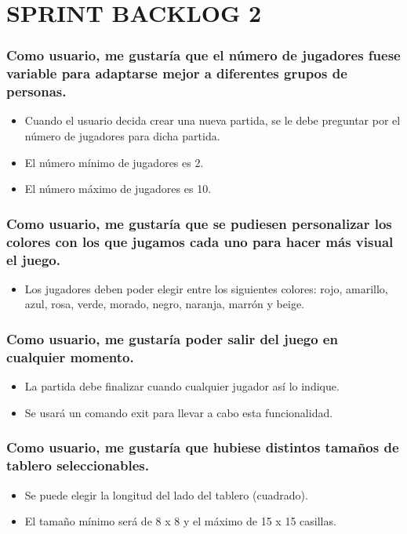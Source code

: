 \documentclass{article}
\begin{document}
\newpage
\section*{SPRINT BACKLOG 2}
\subsubsection*{Como usuario, me gustaría que el número de jugadores fuese variable para adaptarse mejor a diferentes grupos de personas.}

\begin{itemize}
\item Cuando el usuario decida crear una nueva partida, se le debe preguntar por el número de jugadores para dicha partida.

\item El número mínimo de jugadores es 2.

\item El número máximo de jugadores es 10.

\end{itemize}

\subsubsection*{Como usuario, me gustaría que se pudiesen personalizar los colores con los que jugamos cada uno para hacer más visual el juego.}
\begin{itemize}

\item Los jugadores deben poder elegir entre los siguientes colores: rojo, amarillo, azul, rosa, verde, morado, negro, naranja, marrón y beige.

\end{itemize}


\subsubsection*{Como usuario, me gustaría poder salir del juego en cualquier momento.}

\begin{itemize}

\item La partida debe finalizar cuando cualquier jugador así lo indique.

\item Se usará un comando exit para llevar a cabo esta funcionalidad.

\end{itemize}

\subsubsection*{Como usuario, me gustaría que hubiese distintos tamaños de tablero seleccionables.}

\begin{itemize}

\item Se puede elegir la longitud del lado del tablero (cuadrado).

\item El tamaño mínimo será de 8 x 8 y el máximo de 15 x 15 casillas.

\end{itemize}
\end{document}
